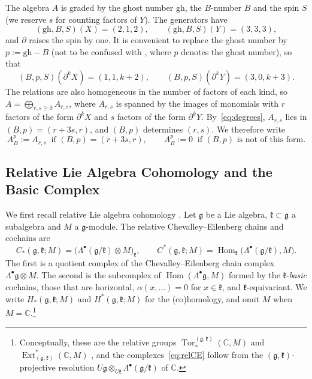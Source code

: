 \documentclass[11pt]{amsart}
\numberwithin{equation}{section}
\theoremstyle{definition}
\theoremstyle{remark}
\newcommand{\C}{\mathbb{C}}
\newcommand{\g}{\mathfrak{g}}
\newcommand{\dd}{\partial}
\newcommand{\Hom}{\operatorname{Hom}}
\newcommand{\gh}{\mathrm{gh}}
\newcommand{\Ext}{\operatorname{Ext}}
\begin{document}
The algebra $A$ is graded by the ghost number $\gh$, the $B$-number $B$ and the spin $S$ (we reserve $s$ for counting factors of $Y$). The generators have
\begin{equation}\label{eq:gradings-XY}
(\gh,B,S)(X)=(2,1,2),\qquad(\gh,B,S)(Y)=(3,3,3),
\end{equation}
and $\dd$ raises the spin by one. It is convenient to replace the ghost number by $p:=\gh-B$ (not to be confused with \cite[(2.34)]{Kha26}, where $p$ denotes the ghost number), so that
\begin{equation}\label{eq:degrees}
(B,p,S)(\dd^kX)=(1,1,k+2),\qquad (B,p,S)(\dd^kY)=(3,0,k+3).
\end{equation}
The relations are also homogeneous in the number of factors of each kind, so $A=\bigoplus_{r,s\ge0}A_{r,s}$, where $A_{r,s}$ is spanned by the images of monomials with $r$ factors of the form $\dd^kX$ and $s$ factors of the form $\dd^kY$. By~\eqref{eq:degrees}, $A_{r,s}$ lies in $(B,p)=(r+3s,r)$, and $(B,p)$ determines $(r,s)$. We therefore write
\begin{equation}\label{eq:ABp}
A_B^p:=A_{r,s}\ \text{ if }(B,p)=(r+3s,r),\qquad A_B^p:=0\ \text{ if $(B,p)$ is not of this form.}
\end{equation}

\subsection{Relative Lie Algebra Cohomology and the Basic Complex}\label{subsec:basic}
We first recall relative Lie algebra cohomology \cite{CE48,HS53}. Let $\g$ be a Lie algebra, $\mathfrak k\subset\g$ a subalgebra and $M$ a $\g$-module. The relative Chevalley--Eilenberg chains and cochains are
\begin{equation}\label{eq:relCE}
C_*(\g,\mathfrak k;M)=\bigl(\Lambda^\bullet(\g/\mathfrak k)\otimes M\bigr)_{\mathfrak k},\qquad
C^*(\g,\mathfrak k;M)=\Hom_{\mathfrak k}\bigl(\Lambda^\bullet(\g/\mathfrak k),M\bigr).
\end{equation}
The first is a quotient complex of the Chevalley--Eilenberg chain complex $\Lambda^\bullet\g\otimes M$. The second is the subcomplex of $\Hom(\Lambda^\bullet\g,M)$ formed by the $\mathfrak k$-\emph{basic} cochains, those that are horizontal, $\alpha(x,\dots)=0$ for $x\in\mathfrak k$, and $\mathfrak k$-equivariant. We write $H_*(\g,\mathfrak k;M)$ and $H^*(\g,\mathfrak k;M)$ for the (co)homology, and omit $M$ when $M=\C$.\footnote{Conceptually, these are the relative groups $\operatorname{Tor}^{(\g,\mathfrak k)}_*(\C,M)$ and $\Ext^*_{(\g,\mathfrak k)}(\C,M)$ \cite{Hoc56}, and the complexes~\eqref{eq:relCE} follow from the $(\g,\mathfrak k)$-projective resolution $U\g\otimes_{U\mathfrak k}\Lambda^\bullet(\g/\mathfrak k)$ of $\C$.}
\end{document}
